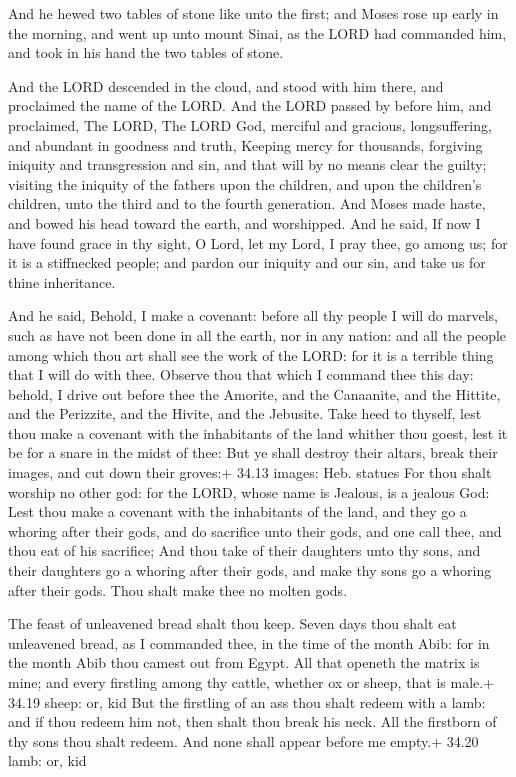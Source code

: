  And he hewed two tables of stone like unto the first; and
Moses rose up early in the morning, and went up unto mount Sinai, as the
LORD had commanded him, and took in his hand the two tables of stone.

 And the LORD descended in the cloud, and stood with him
there, and proclaimed the name of the LORD.  And the LORD
passed by before him, and proclaimed, The LORD, The LORD God, merciful
and gracious, longsuffering, and abundant in goodness and truth,
 Keeping mercy for thousands, forgiving iniquity and
transgression and sin, and that will by no means clear the guilty;
visiting the iniquity of the fathers upon the children, and upon the
children's children, unto the third and to the fourth generation.
 And Moses made haste, and bowed his head toward the earth,
and worshipped.  And he said, If now I have found grace in
thy sight, O Lord, let my Lord, I pray thee, go among us; for it is a
stiffnecked people; and pardon our iniquity and our sin, and take us for
thine inheritance.

 And he said, Behold, I make a covenant: before all thy
people I will do marvels, such as have not been done in all the earth,
nor in any nation: and all the people among which thou art shall see the
work of the LORD: for it is a terrible thing that I will do with thee.
 Observe thou that which I command thee this day: behold, I
drive out before thee the Amorite, and the Canaanite, and the Hittite,
and the Perizzite, and the Hivite, and the Jebusite.  Take
heed to thyself, lest thou make a covenant with the inhabitants of the
land whither thou goest, lest it be for a snare in the midst of thee:
 But ye shall destroy their altars, break their images, and
cut down their groves:+ 34.13 images: Heb. statues  For
thou shalt worship no other god: for the LORD, whose name is Jealous, is
a jealous God:  Lest thou make a covenant with the
inhabitants of the land, and they go a whoring after their gods, and do
sacrifice unto their gods, and one call thee, and thou eat of his
sacrifice;  And thou take of their daughters unto thy sons,
and their daughters go a whoring after their gods, and make thy sons go
a whoring after their gods.  Thou shalt make thee no molten
gods.

 The feast of unleavened bread shalt thou keep. Seven
days thou shalt eat unleavened bread, as I commanded thee, in the time
of the month Abib: for in the month Abib thou camest out from Egypt.
 All that openeth the matrix is mine; and every firstling
among thy cattle, whether ox or sheep, that is male.+ 34.19 sheep: or,
kid  But the firstling of an ass thou shalt redeem with a
lamb: and if thou redeem him not, then shalt thou break his neck. All
the firstborn of thy sons thou shalt redeem. And none shall appear
before me empty.+ 34.20 lamb: or, kid

